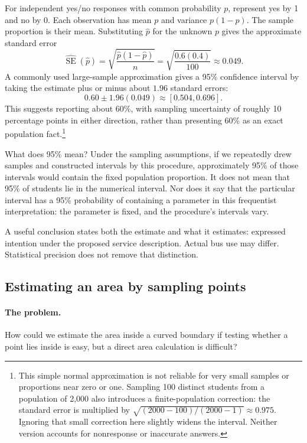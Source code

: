 For independent yes/no responses with common probability $p$, represent
yes by 1 and no by 0. Each observation has mean $p$ and variance $p(1-p)$.
The sample proportion is their mean. Substituting $\hat p$ for the unknown
$p$ gives the approximate standard error
\[
 \widehat{\operatorname{SE}}(\hat p)
 =\sqrt{\frac{\hat p(1-\hat p)}{n}}
 =\sqrt{\frac{0.6(0.4)}{100}}\approx 0.049.
\]
A commonly used large-sample approximation gives a 95\% confidence interval
by taking the estimate plus or minus about $1.96$ standard errors:
\[
 0.60\pm1.96(0.049)\approx[0.504,0.696].
\]
This suggests reporting about 60\%, with sampling uncertainty of roughly
10 percentage points in either direction, rather than presenting 60\%
as an exact population fact.\footnote{This simple normal approximation is
not reliable for very small samples or proportions near zero or one.
Sampling 100 distinct students from a population of 2,000 also introduces
a finite-population correction: the standard error is multiplied by
$\sqrt{(2000-100)/(2000-1)}\approx 0.975$. Ignoring that small correction here
slightly widens the interval. Neither version accounts for nonresponse
or inaccurate answers.}

What does 95\% mean? Under the sampling assumptions, if we repeatedly drew
samples and constructed intervals by this procedure, approximately 95\%
of those intervals would contain the fixed population proportion. It does
not mean that 95\% of students lie in the numerical interval. Nor does it
say that the particular interval has a 95\% probability of containing a
parameter in this frequentist interpretation: the parameter is fixed,
and the procedure's intervals vary.

A useful conclusion states both the estimate and what it estimates:
expressed intention under the proposed service description. Actual bus
use may differ. Statistical precision does not remove that distinction.

\subsection{Estimating an area by sampling points}
\label{sec:ds-area}
\paragraph{The problem.}
How could we estimate the area inside a curved boundary if testing whether
a point lies inside is easy, but a direct area calculation is difficult?

